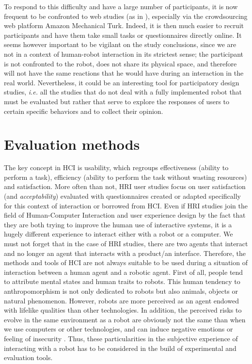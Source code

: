 \documentclass[a4paper,11pt,twoside]{StyleThese}
\begin{document}
To respond to this difficulty and have a large number of participants, it is now frequent to be confronted to web studies (as in \cite{khambhaita_head-body_2016}), especially via the crowdsourcing web platform Amazon Mechanical Turk. Indeed, it is then much easier to recruit participants and have them take small tasks or questionnaires directly online. It seems however important to be vigilant on the study conclusions, since we are not in a context of human-robot interaction in its strictest sense; the participant is not confronted to the robot, does not share its physical space, and therefore will not have the same reactions that he would have during an interaction in the real world. Nevertheless, it could be an interesting tool for participatory design studies, \textit{i.e.} all the studies that do not deal with a fully implemented robot that must be evaluated but rather that serve to explore the responses of users to certain specific behaviors and to collect their opinion. 

\section{Evaluation methods}
\label{sec:evaluation}

The key concept in HCI is usability, which regroups effectiveness (ability to perform a task), efficiency (ability to perform the task without wasting resources) and satisfaction. More often than not, HRI user studies focus on user satisfaction (and \textit{acceptability}) evaluated with questionnaires created or adapted specifically for this context of interaction or borrowed from HCI. Even if HRI studies join the field of Human-Computer Interaction and user experience design by the fact that they are both trying to improve the human use of interactive systems, it is a hugely different experience to interact either with a robot or a computer. We must not forget that in the case of HRI studies, there are two agents that interact and no longer an agent that interacts with a product/an interface. Therefore, the methods and tools of HCI are not always suitable to be used during a situation of interaction between a human agent and a robotic agent. First of all, people tend to attribute mental states and human traits to robots. This human tendency to anthropomorphism is not only dedicated to robots but also animals, objects or natural phenomenon. However, robots are more perceived as an agent endowed with lifelike qualities than other technologies. 
In addition, the perceived risks to evolve in the same environment as a robot are obviously not the same than when we use computers or other technologies, and can induce negative emotions or feeling of insecurity \cite{dautenhahn2006may}. 
Thus, these particularities in the subjective experience of interacting with a robot has to be considered in the build of experimental and evaluation tools.
\end{document}
